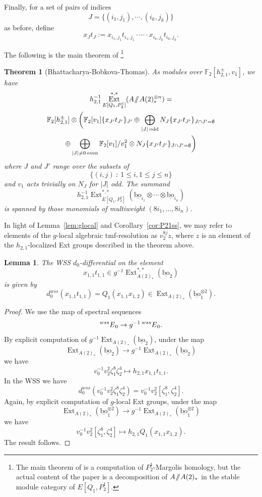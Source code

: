 \documentclass[10pt]{amsart}
\newcommand{\sslash}{\mathbin{/\mkern-6mu/}}
\newcommand{\mmod}{\! \sslash \!}
\newcommand{\ul}[1]{\underline{#1}}
\newcommand{\mr}[1]{\mathrm{#1}}
\newcommand{\abs}[1]{\lvert #1 \rvert}
\newcommand{\FF}{\mathbb{F}}
\newcommand{\bo}{\mathrm{bo}}
\newcommand{\bou}{\ul{\bo}}
\newtheorem{thm}[equation]{Theorem}
\newtheorem{lem}[equation]{Lemma}
\theoremstyle{definition}
\numberwithin{equation}{section}
\numberwithin{figure}{section}
\DeclareMathOperator{\Ext}{Ext}
\newcommand{\E}[2]{\prescript{#1}{#2}{E}}
\begin{document}
Finally, for a set of pairs of indices
$$ J = \{(i_1,j_1), \cdots , (i_k,j_k)\} $$ 
as before, define
$$ x_Jt_J := x_{i_1,j_1}t_{i_1,j_1} \cdot \cdots \cdot x_{i_k,j_k}t_{i_k,j_k}. $$

The following is the main theorem of \cite{BBT}\footnote{The main theorem of \cite{BBT} is a computation of $P_2^1$-Margolis homology, but the actual content of the paper is a decomposition of $A\mmod A(2)_*$ in the stable module category of $E[Q_1, P_2^1]$.} 

\begin{thm}[Bhattacharya-Bobkova-Thomas]\label{thm:BBT}
As modules over $\FF_2[h^\pm_{2,1}, v_1]$, we have
\begin{multline*} 
h_{2,1}^{-1}\Ext^{*,*}_{E[Q_1,P_2^1]}(A \mmod A(2)_*^{\otimes n}) = \\
\FF_2[h_{2,1}^{\pm}] \otimes \bigg( \FF_2[v_1]\{x_{J'}t_{J'}\}_{J'} \oplus 
\bigoplus_{\abs{J} \: \mr{odd}} N_J\{x_{J'}t_{J'}\}_{J \cap J' = \emptyset} 
\\
\oplus \bigoplus_{\abs{J} \ne 0 \: \mr{even}}
\FF_2[v_1]/v_1^2 \otimes N_J\{x_{J'}t_{J'}\}_{J \cap J' = \emptyset} \bigg)
\end{multline*}
where $J$ and $J'$ range over the subsets of
$$ \{ (i,j) \: : \: 1 \le i, 1 \le j \le n \} $$ 
and $v_1$ acts trivially on $N_J$ for $\abs{J}$ odd.  The summand 
$$ h_{2,1}^{-1}\Ext^{*,*}_{E[Q_1,P_2^1]}(\bou_{i_1} \otimes \cdots \otimes \bou_{i_n}) $$
is spanned by those monomials of multiweight $(8i_1, \ldots, 8i_n)$.
\end{thm}

In light of Lemma~\ref{lem:glocal} and Corollary~\ref{cor:P21ss}, we may refer to elements of the $g$-local algebraic tmf-resolution as $v_2^{8j}z$, where $z$ is an element of the $h_{2,1}$-localized Ext groups described in the theorem above.

\begin{lem}\label{lem:dxt}
The WSS $d_0$-differential on the element
$$ x_{1,1}t_{1,1} \in g^{-1}\Ext^{*,*}_{A(2)_*}(\bou_2) $$
is given by
$$ d^{wss}_0(x_{1,1}t_{1,1}) = Q_1(x_{1,1}x_{1,2}) \in \Ext_{A(2)_*}(\bou_1^{\otimes 2}). $$
\end{lem}

\begin{proof}
We use the map of spectral sequences
$$ \E{wss}{}_0 \rightarrow g^{-1} \E{wss}{}_0. $$
By explicit computation of $g^{-1}\Ext_{A(2)_*}(\bou_2)$, under the map
$$ \Ext_{A(2)_*}(\bou_2) \rightarrow g^{-1} \Ext_{A(2)_*}(\bou_2) $$
we have
$$ v_0^{-1}v_2^2 \zeta_1^8\zeta_2^4 \mapsto h_{2,1}x_{1,1}t_{1,1}. $$
In the WSS we have 
\begin{equation}\label{eq:dzeta18zeta24}
 d_0^{wss}(v_0^{-1}v_2^2 \zeta_1^8\zeta_2^4) = v_0^{-1}v_2^2 [\zeta_1^8,\zeta_2^4]. 
 \end{equation}
Again, by explicit computation of $g$-local Ext groups, under the map
$$ \Ext_{A(2)_*}(\bou_1^{\otimes 2}) \rightarrow g^{-1} \Ext_{A(2)_*}(\bou_1^{\otimes 2}) $$
we have
$$ v_0^{-1}v_2^2 [\zeta_1^8,\zeta_2^4] \mapsto h_{2,1}Q_1(x_{1,1}x_{1,2}). $$
The result follows.
\end{proof}
\end{document}
